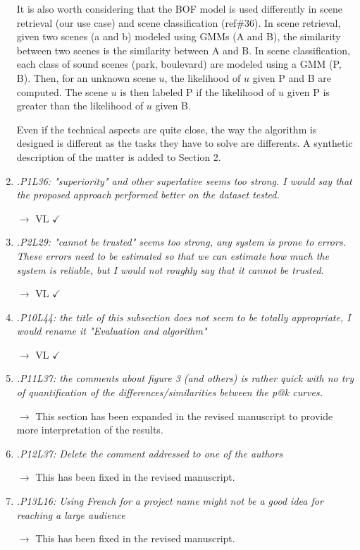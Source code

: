 \documentclass[10pt]{article}
\begin{document}
\begin{enumerate}
It is also worth considering that the BOF model is used differently in scene retrieval (our use case) and scene classification (ref\#36). In scene retrieval, given two scenes (a and b) modeled using GMMs (A and B), the similarity between two scenes is the similarity between A and B. In scene classification, each class of sound scenes (park, boulevard) are modeled using a GMM (P, B). Then, for an unknown scene $u$, the likelihood of $u$ given P and B are computed. The scene $u$ is then labeled P if the likelihood of $u$ given P is greater than the likelihood of $u$ given B.

Even if the technical aspects are quite close, the way the algorithm is designed is different as the tasks they have to solve are differents. A synthetic description of the matter is added to Section 2.

\item \emph{.P1L36: "superiority" and other superlative seems too strong. I would say that the proposed approach performed better on the dataset tested.}

$\rightarrow$ VL $\checkmark$

\item \emph{.P2L29: "cannot be trusted" seems too strong, any system is prone to errors. These errors need to be estimated so that we can estimate how much the system is reliable, but I would not roughly say that it cannot be trusted.}

$\rightarrow$ VL $\checkmark$

\item \emph{.P10L44: the title of this subsection does not seem to be totally appropriate, I would rename it "Evaluation and algorithm"}

$\rightarrow$ VL $\checkmark$

\item \emph{.P11L37: the comments about figure 3 (and others) is rather quick with no try of quantification of the differences/similarities between the p@k curves.}

$\rightarrow$
This section has been expanded in the revised manuscript to provide more interpretation of the results.

\item \emph{.P12L37: Delete the comment addressed to one of the authors}

$\rightarrow$
This has been fixed in the revised manuscript.

\item \emph{.P13L16: Using French for a project name might not be a good idea for reaching a large audience}

$\rightarrow$
This has been fixed in the revised manuscript.

\end{enumerate}
\end{document}
